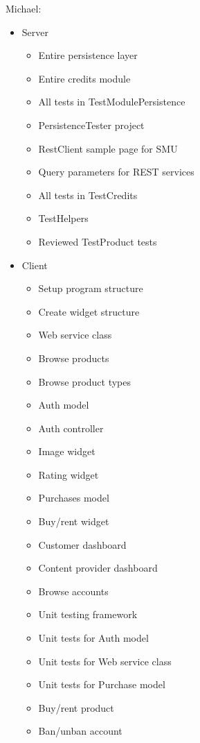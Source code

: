 Michael: 
\begin{itemize}
	\item Server
	\begin{itemize}
		\item Entire persistence layer
		\item Entire credits module
		\item All tests in TestModulePersistence
		\item PersistenceTester project
		\item RestClient sample page for SMU
		\item Query parameters for REST services
		\item All tests in TestCredits
		\item TestHelpers
		\item Reviewed TestProduct tests
	\end{itemize}
	\item Client
	\begin{itemize}
		\item Setup program structure
		\item Create widget structure
		\item Web service class
		\item Browse products
		\item Browse product types
		\item Auth model
		\item Auth controller
		\item Image widget
		\item Rating widget
		\item Purchases model
		\item Buy/rent widget
		\item Customer dashboard
		\item Content provider dashboard
		\item Browse accounts
		\item Unit testing framework
		\item Unit tests for Auth model
		\item Unit tests for Web service class
		\item Unit tests for Purchase model
		\item Buy/rent product
		\item Ban/unban account
	\end{itemize}
\end{itemize}